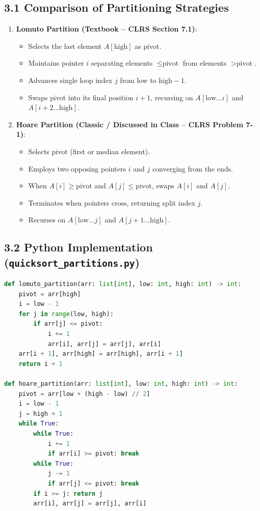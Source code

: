 \documentclass[12pt]{article}
\begin{document}
\subsection*{3.1 Comparison of Partitioning Strategies}
\begin{enumerate}
    \item \textbf{Lomuto Partition (Textbook -- CLRS Section 7.1)}:
    \begin{itemize}
        \item Selects the last element $A[\text{high}]$ as pivot.
        \item Maintains pointer $i$ separating elements $\le \text{pivot}$ from elements $> \text{pivot}$.
        \item Advances single loop index $j$ from $\text{low}$ to $\text{high}-1$.
        \item Swaps pivot into its final position $i+1$, recursing on $A[\text{low} \dots i]$ and $A[i+2 \dots \text{high}]$.
    \end{itemize}
    \item \textbf{Hoare Partition (Classic / Discussed in Class -- CLRS Problem 7-1)}:
    \begin{itemize}
        \item Selects pivot (first or median element).
        \item Employs two opposing pointers $i$ and $j$ converging from the ends.
        \item When $A[i] \ge \text{pivot}$ and $A[j] \le \text{pivot}$, swaps $A[i]$ and $A[j]$.
        \item Terminates when pointers cross, returning split index $j$.
        \item Recurses on $A[\text{low} \dots j]$ and $A[j+1 \dots \text{high}]$.
    \end{itemize}
\end{enumerate}

\subsection*{3.2 Python Implementation (\texttt{quicksort\_partitions.py})}
\begin{lstlisting}[language=Python]
def lomuto_partition(arr: list[int], low: int, high: int) -> int:
    pivot = arr[high]
    i = low - 1
    for j in range(low, high):
        if arr[j] <= pivot:
            i += 1
            arr[i], arr[j] = arr[j], arr[i]
    arr[i + 1], arr[high] = arr[high], arr[i + 1]
    return i + 1

def hoare_partition(arr: list[int], low: int, high: int) -> int:
    pivot = arr[low + (high - low) // 2]
    i = low - 1
    j = high + 1
    while True:
        while True:
            i += 1
            if arr[i] >= pivot: break
        while True:
            j -= 1
            if arr[j] <= pivot: break
        if i >= j: return j
        arr[i], arr[j] = arr[j], arr[i]
\end{lstlisting}
\end{document}
